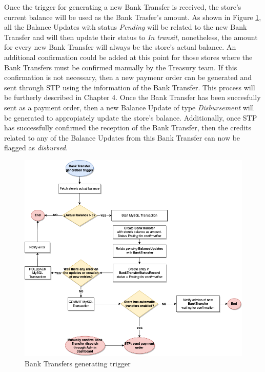 Once the trigger for generating a new Bank Transfer is received, the store's current balance will be used as the Bank Trasfer's amount. As shown in Figure \ref{fig:bank_Transfer_trigger}, all the Balance Updates with status \textit{Pending} will be related to the new Bank Transfer and will then update their status to \textit{In transit}, nonetheless, the amount for every new Bank Transfer will always be the store's actual balance. An additional confirmation could be added at this point for those stores where the Bank Transfers must be confirmed manually by the Treasury team. If this confirmation is not necessary, then a new paymenr order can be generated and sent through STP using the information of the Bank Transfer. This process will be furtherly described in Chapter 4. Once the Bank Transfer has been succesfully sent as a payment order, then a new Balance Update of type \textit{Disbursement} will be generated to appropiately update the store's balance. Additionally, once STP has successfully confirmed the reception of the Bank Transfer, then the credits related to any of the Balance Updates from this Bank Transfer can now be flagged as \textit{disbursed}.\\

\begin{figure} [H]
    \centering
    \includegraphics[scale = 0.4]{assets/flowcharts/BankTransferTrigger.png}
    \caption{Bank Transfers generating trigger}\label{fig:bank_Transfer_trigger}
\end{figure}

